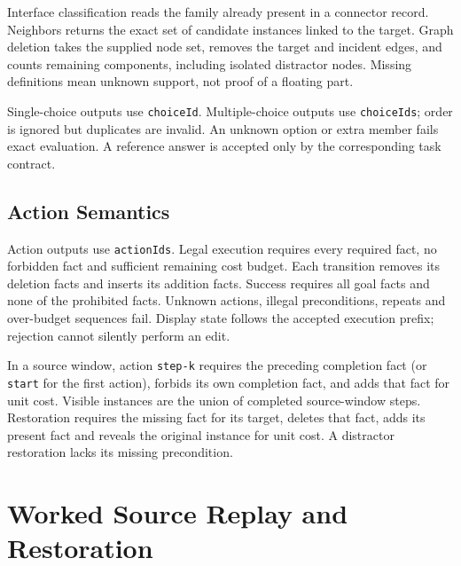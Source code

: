 \documentclass[10pt,letterpaper]{article}
\begin{document}
Interface classification reads the family already present in a
connector record. Neighbors returns the exact set of candidate
instances linked to the target. Graph deletion takes the supplied node
set, removes the target and incident edges, and counts remaining
components, including isolated distractor nodes. Missing definitions
mean unknown support, not proof of a floating part.

Single-choice outputs use \texttt{choiceId}. Multiple-choice outputs
use \texttt{choiceIds}; order is ignored but duplicates are invalid.
An unknown option or extra member fails exact evaluation. A reference
answer is accepted only by the corresponding task contract.

\subsection{Action Semantics}
Action outputs use \texttt{actionIds}. Legal execution requires every
required fact, no forbidden fact and sufficient remaining cost budget.
Each transition removes its deletion facts and inserts its addition
facts. Success requires all goal facts and none of the prohibited
facts. Unknown actions, illegal preconditions, repeats and over-budget
sequences fail. Display state follows the accepted execution prefix;
rejection cannot silently perform an edit.

In a source window, action \texttt{step-k} requires the preceding
completion fact (or \texttt{start} for the first action), forbids its
own completion fact, and adds that fact for unit cost. Visible
instances are the union of completed source-window steps. Restoration
requires the missing fact for its target, deletes that fact, adds its
present fact and reveals the original instance for unit cost. A
distractor restoration lacks its missing precondition.

\clearpage
\section{Worked Source Replay and Restoration}
\end{document}
